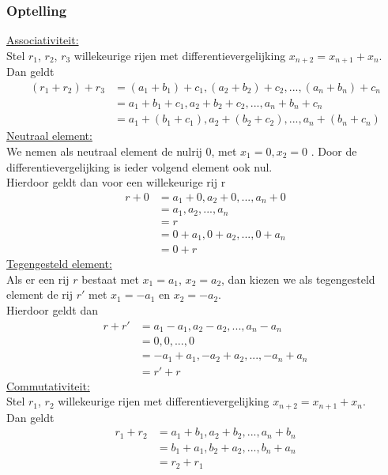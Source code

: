 \documentclass[10pt,a4paper]{article}
\begin{document}
\subsubsection*{Optelling}
\underline{Associativiteit:}\\
Stel $r_1$, $r_2$, $r_3$ willekeurige rijen met differentievergelijking $x_{n + 2} = x_{n + 1} + x_n$.\\
Dan geldt
\begin{align*}
    (r_1 + r_2) + r_3 &= (a_1 + b_1) + c_1 , (a_2 + b_2) + c_2 , ... , (a_n + b_n)+ c_n\\
    &= a_1 + b_1 + c_1, a_2 + b_2 + c_2, ... , a_n + b_n + c_n\\
    &= a_1 + (b_1 + c_1), a_2 + (b_2 + c_2), ..., a_n + (b_n + c_n)
\end{align*}
\underline{Neutraal element:}\\
We nemen als neutraal element de nulrij 0, met $x_1 = 0, x_2 = 0$ . 
Door de differentievergelijking is ieder volgend element ook nul.\\
Hierdoor geldt dan voor een willekeurige rij r
\begin{align*}
  r + 0 &= a_1 + 0, a_2 + 0, ..., a_n + 0\\
  &= a_1, a_2, ..., a_n\\
  &= r\\
  &= 0 + a_1, 0 + a_2, ..., 0 + a_n\\
  &= 0 + r
\end{align*}
\underline{Tegengesteld element:}\\
Als er een rij $r$ bestaat met $x_1 = a_1$, $x_2 = a_2$, dan kiezen we als tegengesteld element de rij $r'$ met $x_1 = -a_1$ en $x_2 = -a_2$.\\
Hierdoor geldt dan
\begin{align*}
    r + r' &= a_1 - a_1, a_2 - a_2, ...,a_n - a_n\\
    &= 0, 0, ..., 0\\
    &= -a_1 + a_1, -a_2 + a_2, ..., -a_n + a_n\\
    &= r' + r
\end{align*}
\underline{Commutativiteit:}\\
Stel $r_1$, $r_2$ willekeurige rijen met differentievergelijking $x_{n + 2} = x_{n + 1} + x_n$.\\
Dan geldt
\begin{align*}
    r_1 + r_2 &= a_1 + b_1, a_2 + b_2, ..., a_n + b_n\\
    &= b_1 + a_1, b_2 + a_2, ..., b_n + a_n\\
    &= r_2 + r_1
\end{align*}
\end{document}
